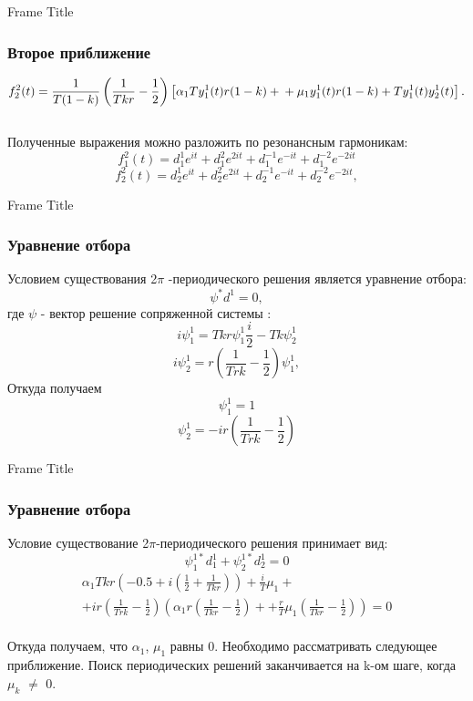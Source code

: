 \documentclass[12pt]{beamer}
\begin{document}
\begin{frame}{Frame Title}
\frametitle{Второе приближение}
      \begin{equation*}
    f^2_2(t)=\frac{1}{T (1-k)}\left( \frac{1}{T k r} - \frac{1}{2} \right)\left[ \alpha_1 T y^1_1(t)r(1-k)+\\+\mu_1 y^1_1 (t)r(1-k) + T y^1_1(t) y^1_2(t)       \right].
    \end{equation*}\\
    Полученные выражения можно разложить по резонансным гармоникам:
    \begin{equation}
      f^2_1(t)=d^1_1 e^{i t}+d^2_1 e^{2 i t} +d^{-1}_1e^{-i t}+d^{-2}_1 e^{-2 i t}
    \end{equation}
    \begin{equation*}
      f^2_2(t)=d^1_2 e^{i t}+d^2_2 e^{2 i t} +d^{-1}_2e^{-i t}+d^{-2}_2 e^{-2 i t},
    \end{equation*}
\end{frame}
\begin{frame}{Frame Title}
\frametitle{Уравнение отбора}
    Условием существования 2$\pi$ -периодического решения является уравнение отбора:
\begin{equation*}
    \psi^* d^1 =0,
\end{equation*}
где $\psi$ - вектор решение сопряженной системы :
 \begin{equation*}
     i \psi_1^1=T k r \psi_1^1 \frac{i}{2}- T k \psi_2^1
 \end{equation*}
 \begin{equation*}
     i \psi_2^1=r \left(  \frac{1}{T r k} - \frac{1}{2}\right) \psi_1^1 ,
 \end{equation*}
 Откуда получаем
 \begin{equation*}
     \psi_1^1 =1
 \end{equation*}
 \begin{equation*}
     \psi_2^1=-i r \left(  \frac{1}{T r k} - \frac{1}{2}\right)
 \end{equation*}
\end{frame}
\begin{frame}{Frame Title}
\frametitle{Уравнение отбора}
    Условие существование 2$\pi$-периодического решения принимает вид:
\begin{equation}
    \psi_1^{1*} d^1_1+\psi_2^{1*} d^1_2 =0
\end{equation}
\begin{multline*}
   \alpha_1 T k r \left ( -0.5+i(\frac{1}{2}+\frac{1}{T k r}) \right)+\frac{i}{T} \mu_1+\\+i r \left(  \frac{1}{T r k} - \frac{1}{2}\right) \left(\alpha_1  r \left ( \frac{1}{T k r}-\frac{1}{2} \right)++\frac{r}{T} \mu_1 \left ( \frac{1}{T k r}-\frac{1}{2} \right)\right) =0
\end{multline*}\\
Откуда получаем, что $\alpha_1$, $\mu_1$ равны 0. Необходимо рассматривать следующее приближение. Поиск периодических решений заканчивается на k-ом шаге, когда $\mu_k$ $\neq$ 0.
\end{frame}
\end{document}
